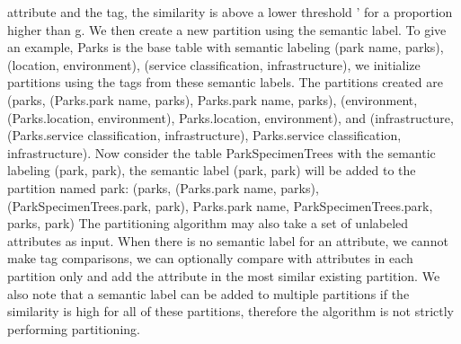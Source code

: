 attribute and the tag, the similarity is above a lower threshold ' for a proportion higher than g. We then create a new partition using the semantic label.
To give an example, Parks is the base table with semantic labeling {(park name, parks), (location, environment), (service classification, infrastructure)}, we initialize partitions using the tags from these semantic labels. The partitions created are
(parks, {(Parks.park name, parks)}, {Parks.park name}, {parks}),
(environment, {(Parks.location, environment)}, {Parks.location}, {environment}), and
(infrastructure, {(Parks.service classification, infrastructure)}, {Parks.service classification}, {infrastructure}).
Now consider the table ParkSpecimenTrees with the semantic labeling {(park, park)}, the semantic label (park, park) will be added to the partition named park:
(parks, {(Parks.park name, parks), (ParkSpecimenTrees.park, park)}, {Parks.park name, ParkSpecimenTrees.park}, {parks, park})
The partitioning algorithm may also take a set of unlabeled attributes as input. When there is no semantic label for an attribute, we cannot make tag comparisons, we can optionally compare with attributes in each partition only and add the attribute in the most similar existing partition. We also note that a semantic label can be added to multiple partitions if the similarity is high for all of these partitions, therefore the algorithm is not strictly performing partitioning.
